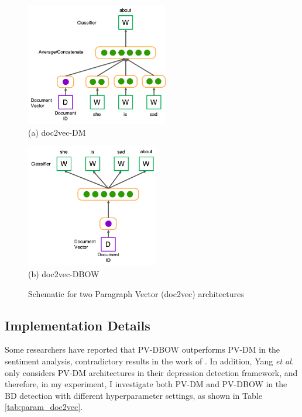 \begin{figure}[ht]
    \centering
    \begin{minipage}{0.55\textwidth}
        \centering
        \includegraphics[height=5.4cm]{images/design/doc2vec_dm-m.png} \\
        (a) doc2vec-DM
    \end{minipage}
    \begin{minipage}{0.43\textwidth}
        \centering
        \includegraphics[height=5.4cm]{images/design/doc2vec_dbow.png} \\
        (b) doc2vec-DBOW
    \end{minipage}
    \caption{Schematic for two Paragraph Vector (doc2vec) architectures}
    \label{fig:doc2vec}
\end{figure}


\subsection{Implementation Details}
Some researchers have reported that PV-DBOW outperforms PV-DM in the sentiment analysis, contradictory results in the work of \cite{mikolov2014}. In addition, Yang \textit{et al.} only considers PV-DM architectures in their depression detection framework, and therefore, in my experiment, I investigate both PV-DM and PV-DBOW in the BD detection with different hyperparameter settings, as shown in Table \ref{tab:param_doc2vec}.


